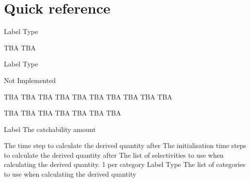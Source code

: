 \section{Quick reference\label{sec:quick-reference}}
\par
{} {Label}
 {Type}
\par\textbf{}\par
{} {TBA}
 {TBA}
\par\textbf{}\par
{}\par\par
{} {Label}
 {Type}
\par\textbf{}\par
{} {Not Implemented}
\par\textbf{}\par
{} {TBA}
 {TBA}
 {TBA}
 {TBA}
 {TBA}
 {TBA}
 {TBA}
 {TBA}
 {TBA}
 {TBA}
\par\textbf{}\par
{} {TBA}
 {TBA}
 {TBA}
 {TBA}
 {TBA}
 {TBA}
 {TBA}
\par\par
{} {Label}
 {The catchability amount}
\par\par
{} {The time step to calculate the derived quantity after}
 {The initialisation time steps to calculate the derived quantity after}
 {The list of selectivities to use when calculating the derived quantity. 1 per category}
 {Label}
 {Type}
 {The list of categories to use when calculating the derived quantity}
\par\textbf{}\par
